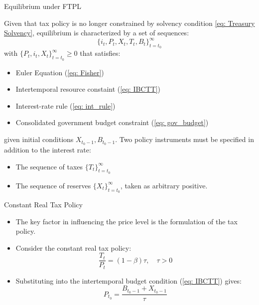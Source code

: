 \documentclass[11pt,aspectratio=169]{beamer}
\begin{document}
\begin{frame}{Equilibrium under FTPL}
\small

Given that tax policy is no longer constrained by solvency condition \eqref{eq: Treasury Solvency}, equilibrium is characterized by a set of sequences:
\[
\{ i_t, P_t, X_t, T_t, B_t \}_{t=t_0}^\infty
\]
with $\{P_t, i_t, X_t \}_{t=t_0}^\infty \geq 0$ that satisfies:
\begin{itemize}
  \item Euler Equation (\ref{eq: Fisher})
  \item Intertemporal resource constaint (\ref{eq: IBCTT})
  \item Interest-rate rule (\ref{eq: int_rule})
  \item Consolidated government budget constraint (\ref{eq: gov_budget})
\end{itemize}

given initial conditions $X_{t_0-1}, B_{t_0-1}$.  
\vspace{0.5cm}
\break
Two policy instruments must be specified in addition to the interest rate:
\begin{itemize}
  \item The sequence of taxes $\{T_t\}_{t=t_0}^\infty$
  \item The sequence of reserves $\{X_t\}_{t=t_0}^\infty$, taken as arbitrary positive.
\end{itemize}

\end{frame}

\begin{frame}{Constant Real Tax Policy}
\begin{itemize}
    \item The key factor in influencing the price level is the formulation of the tax policy.
    \vspace{0.25cm}
\item Consider the constant real tax policy:
    \begin{equation} \label{tax_policy}
    \frac{T_t}{P_t} = (1-\beta)\tau, \quad \tau>0        
    \end{equation}
    \vspace{0.25cm}
    \item Substituting into the intertemporal budget condition (\ref{eq: IBCTT}) gives:
    \begin{equation} \label{Price_Level}
     P_{t_0} = \frac{B_{t_0-1} + X_{t_0-1}}{\tau}
    \end{equation}
\end{itemize}
\end{frame}
\end{document}

